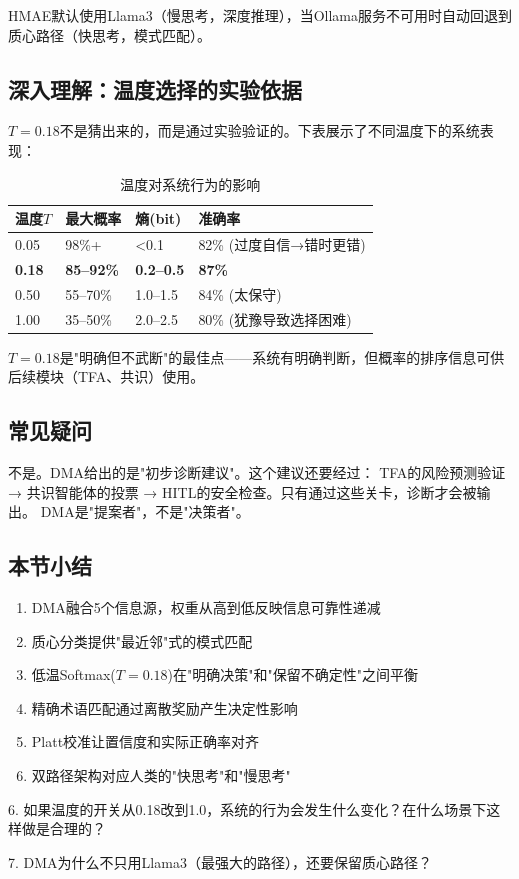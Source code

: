 \documentclass[11pt,a4paper]{ctexart}
\begin{document}
HMAE默认使用Llama3（慢思考，深度推理），当Ollama服务不可用时自动回退到质心路径（快思考，模式匹配）。

\subsection{深入理解：温度选择的实验依据}

$T=0.18$不是猜出来的，而是通过实验验证的。下表展示了不同温度下的系统表现：

\begin{table}[H]
\centering
\small
\begin{tabular}{llll}
\toprule
\textbf{温度$T$} & \textbf{最大概率} & \textbf{熵(bit)} & \textbf{准确率} \\
\midrule
0.05 & 98\%+ & <0.1 & 82\% (过度自信→错时更错) \\
\textbf{0.18} & \textbf{85--92\%} & \textbf{0.2--0.5} & \textbf{87\%} \\
0.50 & 55--70\% & 1.0--1.5 & 84\% (太保守) \\
1.00 & 35--50\% & 2.0--2.5 & 80\% (犹豫导致选择困难) \\
\bottomrule
\end{tabular}
\caption{温度对系统行为的影响}
\end{table}

$T=0.18$是"明确但不武断"的最佳点——系统有明确判断，但概率的排序信息可供后续模块（TFA、共识）使用。

\subsection{常见疑问}

\begin{warnbox}
不是。DMA给出的是"初步诊断建议"。这个建议还要经过：
TFA的风险预测验证 → 共识智能体的投票 → HITL的安全检查。只有通过这些关卡，诊断才会被输出。
DMA是"提案者"，不是"决策者"。
\end{warnbox}

\subsection{本节小结}

\begin{enumerate}[nosep]
\item DMA融合5个信息源，权重从高到低反映信息可靠性递减
\item 质心分类提供"最近邻"式的模式匹配
\item 低温Softmax($T=0.18$)在"明确决策"和"保留不确定性"之间平衡
\item 精确术语匹配通过离散奖励产生决定性影响
\item Platt校准让置信度和实际正确率对齐
\item 双路径架构对应人类的"快思考"和"慢思考"
\end{enumerate}

\begin{exerbox}[思考题]
6. 如果温度的开关从0.18改到1.0，系统的行为会发生什么变化？在什么场景下这样做是合理的？

7. DMA为什么不只用Llama3（最强大的路径），还要保留质心路径？
\end{exerbox}

\newpage
\end{document}
